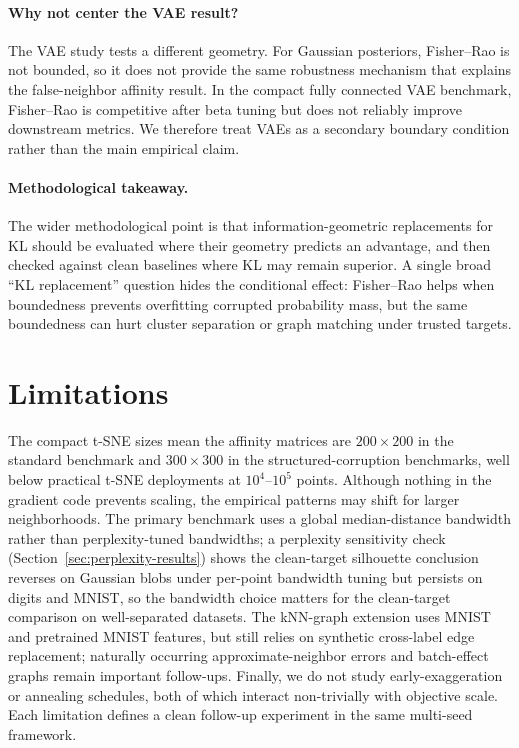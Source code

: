 \documentclass[11pt]{article}
\begin{document}
\paragraph{Why not center the VAE result?}
The VAE study tests a different geometry. For Gaussian posteriors, Fisher--Rao is not bounded,
so it does not provide the same robustness mechanism that explains the false-neighbor affinity
result. In the compact fully connected VAE benchmark, Fisher--Rao is competitive after beta
tuning but does not reliably improve downstream metrics. We therefore treat VAEs as a
secondary boundary condition rather than the main empirical claim.

\paragraph{Methodological takeaway.}
The wider methodological point is that information-geometric replacements for KL should be
evaluated where their geometry predicts an advantage, and then checked against clean baselines
where KL may remain superior. A single broad ``KL replacement'' question hides the conditional
effect: Fisher--Rao helps when boundedness prevents overfitting corrupted probability mass, but
the same boundedness can hurt cluster separation or graph matching under trusted targets.

\section{Limitations}

The compact t-SNE sizes mean the affinity matrices are $200\times200$ in the standard
benchmark and $300\times300$ in the structured-corruption benchmarks, well below practical
t-SNE deployments at $10^4$--$10^5$ points. Although nothing in the gradient code prevents
scaling, the empirical patterns may shift for larger neighborhoods. The primary benchmark uses
a global median-distance bandwidth rather than perplexity-tuned bandwidths; a perplexity
sensitivity check (Section~\ref{sec:perplexity-results}) shows the clean-target silhouette
conclusion reverses on Gaussian blobs under per-point bandwidth tuning but persists on digits
and MNIST, so the bandwidth choice matters for the clean-target comparison on well-separated
datasets. The kNN-graph extension uses MNIST and pretrained MNIST features, but still relies
on synthetic cross-label edge replacement; naturally occurring approximate-neighbor errors and
batch-effect graphs remain important follow-ups. Finally, we do not study early-exaggeration
or annealing schedules, both of which interact non-trivially with objective scale. Each
limitation defines a clean follow-up experiment in the same multi-seed framework.
\end{document}
